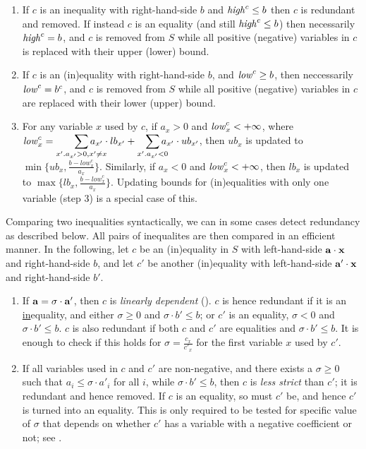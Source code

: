\begin{enumerate} \itemsep0em
\setcounter{enumi}{\value{counterName}}
	\item If $c$ is an inequality with right-hand-side $b$ and $\mathit{high}^c \leq b$ then $c$ is redundant and removed. If instead $c$ is an equality (and still $\mathit{high}^c \leq b$) then necessarily $\mathit{high}^c = b$, and $c$ is removed from $S$ while all positive (negative) variables in $c$ is replaced with their upper (lower) bound.
	\item If $c$ is an (in)equality with right-hand-side $b$, and $\mathit{low}^c \geq b$, then neccessarily $\mathit{low}^c = b^c$, and $c$ is removed from $S$ while all positive (negative) variables in $c$ are replaced with their lower (upper) bound.
	\item For any variable $x$ used by $c$, if $a_x > 0$ and $\mathit{low}_x^c<+\infty$, 
	where $\mi{low}_x^c = \smashoperator[r]{\sum_{x'.a_{x'}>0, x'\neq x}}a_{x'}\cdot lb_{x'} + \smashoperator[r]{\sum_{x'.a_{x'}<0}}a_{x'}\cdot ub_{x'}$, 
	then $ub_x$ is updated to $\min\{ub_x, \frac{b-\mathit{low}_x^c}{a_x}\}$. 
	Similarly, if $a_x < 0$ and $\mathit{low}_x^c<+\infty$, then $lb_x$ is updated to $\max\{lb_x, \frac{b-\mathit{low}_x^c}{a_x}\}$.	
	Updating bounds for (in)equalities with only one variable (step 3) is a special case of this.
\setcounter{counterName}{\value{enumi}}
\end{enumerate}	
%
Comparing two inequalities syntactically, we can in some cases detect redundancy as described below. All pairs of inequalites are then compared in an efficient manner.
In the following, let $c$ be an (in)equality in $S$ with left-hand-side $\mathbf{a}\cdot \mathbf{x}$ and right-hand-side $b$, and let $c'$ be another (in)equality with left-hand-side $\mathbf{a}'\cdot \mathbf{x}$ and right-hand-side $b'$. 
\begin{enumerate} \itemsep0em
\setcounter{enumi}{\value{counterName}}
\item 
If $\mathbf{a}=\sigma\cdot \mathbf{a}'$, then $c$ is \emph{linearly dependent} (\cite{lassez93}). $c$ is hence redundant if
it is an \underline{in}equality, and either $\sigma\geq 0$ and $\sigma\cdot b'\leq b$; or $c'$ is an equality, $\sigma<0$ and $\sigma\cdot b'\leq b$. $c$ is also redundant if both $c$ and $c'$ are equalities and $\sigma\cdot b'\leq b$. 
It is enough to check if this holds for $\sigma = \frac{c_x}{c'_x}$ for the first variable $x$ used by $c'$.
\item
If all variables used in $c$ and $c'$ are non-negative, and there exists a $\sigma\geq 0$ such that $a_i \leq \sigma \cdot a'_i$ for all $i$, while $\sigma\cdot b' \leq b$, then $c$ is \emph{less strict} than $c'$; it is redundant and hence removed. If $c$ is an equality, so must $c'$ be, and hence $c'$ is turned into an equality. 
This is only required to be tested for specific value of $\sigma$ that depends on whether $c'$ has a variable with a negative coefficient or not; see \cite{MyTechRep}.
\end{enumerate} 
%